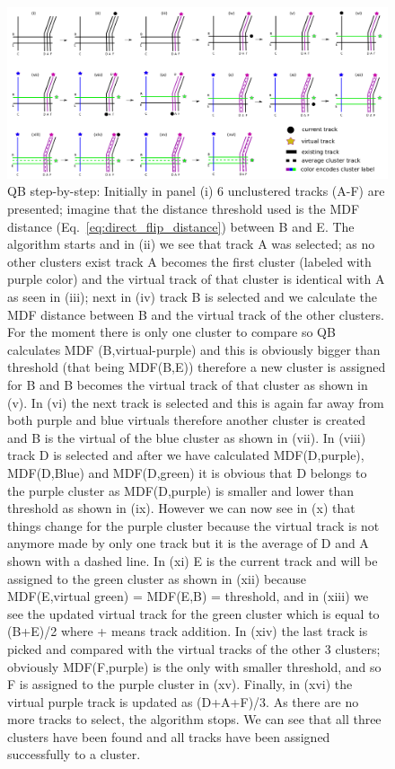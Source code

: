 \documentclass[preprint,authoryear,a4paper,10pt,onecolumn]{elsarticle}
\begin{document}
\begin{figure}
\includegraphics[scale=0.25]{last_figures/LSC_algorithm}
\caption{QB step-by-step: Initially in panel (i) 6 unclustered tracks
  (A-F) are presented; imagine that the distance threshold used is the
  MDF distance (Eq.~\ref{eq:direct_flip_distance}) between B and E. The
  algorithm starts and in (ii) we see that track A was selected; as no
  other clusters exist track A becomes the first cluster
  (labeled with purple color) and the virtual track of that cluster is
  identical with A as seen in (iii); next in (iv) track B is selected
  and we calculate the MDF distance between B and the virtual track of
  the other clusters. For the moment there is only one cluster to
  compare so QB calculates MDF (B,virtual-purple) and this is obviously
  bigger than threshold (that being MDF(B,E)) therefore a new cluster is
  assigned for B and B becomes the virtual track of that cluster as
  shown in (v). In (vi) the next track is selected and this is again far
  away from both purple and blue virtuals therefore another cluster is
  created and B is the virtual of the blue cluster as shown in (vii).
  In (viii) track D is selected and after we have calculated
  MDF(D,purple), MDF(D,Blue) and MDF(D,green) it is obvious that D
  belongs to the purple cluster as MDF(D,purple) is smaller and lower
  than threshold as shown in (ix). However we can now see in (x) that
  things change for the purple cluster because the virtual track is not
  anymore made by only one track but it is the average of D and A shown
  with a dashed line. In (xi) E is the current track and will be assigned to
  the green cluster as shown in (xii) because MDF(E,virtual green) =
  MDF(E,B) = threshold, and in (xiii) we see the updated virtual track
  for the green cluster which is equal to (B+E)/2 where + means track
  addition. In (xiv) the last track is picked and compared with the
  virtual tracks of the other 3 clusters; obviously MDF(F,purple) is the
  only with smaller threshold, and so F is assigned to the purple
  cluster in (xv). Finally, in (xvi) the virtual purple track is updated
  as (D+A+F)/3. As there are no more tracks to select, the algorithm
  stops. We can see that all three clusters have been found and all tracks
  have been assigned successfully to a cluster.\label{Fig:LSC_simple}}
\end{figure}
\end{document}
